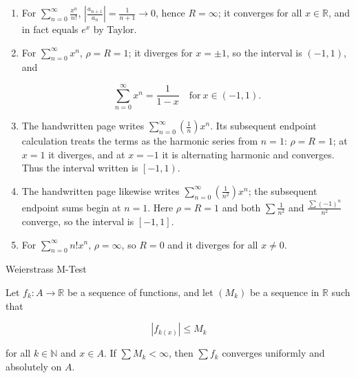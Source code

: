 \begin{example}

\begin{enumerate}
\item
  For \(\sum_{n = 0}^{\infty}\frac{x^{n}}{n!}\), \(\left| \frac{a_{n + 1}}{a_{n}} \right| = \frac{1}{n + 1}\rightarrow 0\), hence \(R = \infty\); it converges for all \(x \in \mathbb{R}\), and in fact equals \(e^{x}\) by Taylor.
\item
  For \(\sum_{n = 0}^{\infty}x^{n}\), \(\rho = R = 1\); it diverges for \(x = \pm 1\), so the interval is \(\left( {- 1,1} \right)\), and

  \[\sum\limits_{n = 0}^{\infty}x^{n} = \frac{1}{1 - x}\quad\text{for}\ x \in \left( {- 1,1} \right).\]
\item
  The handwritten page writes \(\sum_{n = 0}^{\infty}\left( \frac{1}{n} \right)x^{n}\). Its subsequent endpoint calculation treats the terms as the harmonic series from \(n = 1\): \(\rho = R = 1\); at \(x = 1\) it diverges, and at \(x = - 1\) it is alternating harmonic and converges. Thus the interval written is \(\left\lbrack {- 1,1} \right)\).
\item
  The handwritten page likewise writes \(\sum_{n = 0}^{\infty}\left( \frac{1}{n^{2}} \right)x^{n}\); the subsequent endpoint sums begin at \(n = 1\). Here \(\rho = R = 1\) and both \(\sum\frac{1}{n^{2}}\) and \(\frac{{\sum\left( {- 1} \right)}^{n}}{n^{2}}\) converge, so the interval is \(\left\lbrack {- 1,1} \right\rbrack\).
\item
  For \(\sum_{n = 0}^{\infty}n!x^{n}\), \(\rho = \infty\), so \(R = 0\) and it diverges for all \(x \neq 0\).
\end{enumerate}

\end{example}

\begin{theorem}{Weierstrass M-Test}

Let \(f_{k}:A\rightarrow\mathbb{R}\) be a sequence of functions, and let \(\left( M_{k} \right)\) be a sequence in \(\mathbb{R}\) such that

\[\left| f_{k{(x)}} \right| \leq M_{k}\]

for all \(k \in \mathbb{N}\) and \(x \in A\). If \(\sum M_{k} < \infty\), then \(\sum f_{k}\) converges uniformly and absolutely on \(A\).

\end{theorem}

